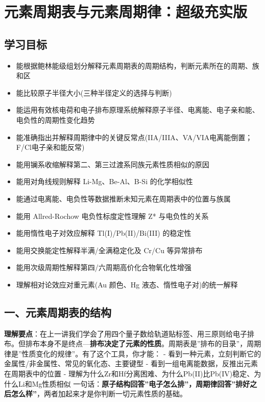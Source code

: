 \section{元素周期表与元素周期律：超级充实版}\label{ux5143ux7d20ux5468ux671fux8868ux4e0eux5143ux7d20ux5468ux671fux5f8bux8d85ux7ea7ux5145ux5b9eux7248}

\subsection{学习目标}\label{ux5b66ux4e60ux76eeux6807}

\begin{itemize}
\tightlist
\item
  能根据鲍林能级组划分解释元素周期表的周期结构，判断元素所在的周期、族和区
\item
  能比较原子半径大小(三种半径定义的选择与判断)
\item
  能运用有效核电荷和电子排布原理系统解释原子半径、电离能、电子亲和能、电负性的周期性变化趋势
\item
  能准确指出并解释周期律中的关键反常点(IIA/IIIA、VA/VIA电离能倒置；F/Cl电子亲和能反常)
\item
  能用镧系收缩解释第二、第三过渡系同族元素性质相似的原因
\item
  能用对角线规则解释 Li-Mg、Be-Al、B-Si 的化学相似性
\item
  能通过电离能、电负性等数据推断未知元素在周期表中的位置与族属
\item
  能用 Allred-Rochow 电负性标度定性理解 Z* 与电负性的关系
\item
  能用惰性电子对效应解释 Tl(I)/Pb(II)/Bi(III) 的稳定性
\item
  能用交换能定性解释半满/全满稳定化及 Cr/Cu 等异常排布
\item
  能用次级周期性解释第四/六周期高价化合物氧化性增强
\item
  理解相对论效应对重元素(Au 颜色、Hg 液态、惰性电子对)的统一解释
\end{itemize}

\subsection{一、元素周期表的结构}\label{ux4e00ux5143ux7d20ux5468ux671fux8868ux7684ux7ed3ux6784}

\textbf{理解要点}：在上一讲我们学会了用四个量子数给轨道贴标签、用三原则给电子排布。但排布本身不是终点---\textbf{排布决定了元素的性质}。周期表是''排布的目录''，周期律是''性质变化的规律''。有了这个工具，你才能：
- 看到一种元素，立刻判断它的金属性/非金属性、常见的氧化态、主要键型
- 看到一组电离能数据，反推出元素在周期表中的位置
- 理解为什么Zr和Hf分离困难、为什么Pb(II)比Pb(IV)稳定、为什么Li和Mg性质相似
一句话：\textbf{原子结构回答''电子怎么排''，周期律回答''排好之后怎么样''}，两者加起来才是你判断一切元素性质的基础。

